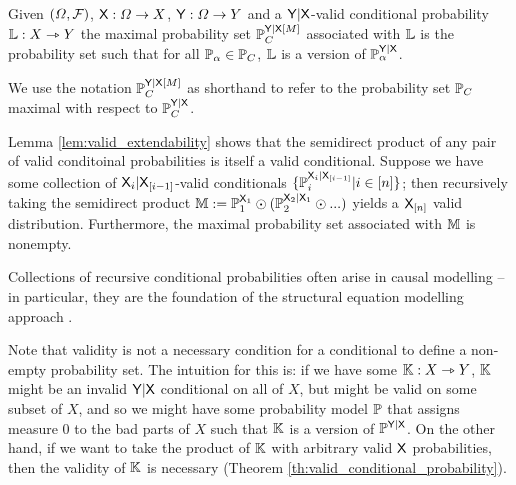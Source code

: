 \begin{definition}
Given $(\Omega,\mathcal{F})$, $\mathsf{X}:\Omega\to X$, $\mathsf{Y}:\Omega\to Y$ and a $\mathsf{Y}|\mathsf{X}$-valid conditional probability $\mathbb{L}:X\rightarrowtriangle Y$ the maximal probability set $\mathbb{P}_C^{\mathsf{Y}|\mathsf{X}[M]}$ associated with $\mathbb{L}$ is the probability set such that for all $\mathbb{P}_\alpha\in \mathbb{P}_C$, $\mathbb{L}$ is a version of $\mathbb{P}_\alpha^{\mathsf{Y}|\mathsf{X}}$.
\end{definition}

We use the notation $\mathbb{P}_C^{\mathsf{Y}|\mathsf{X}[M]}$ as shorthand to refer to the probability set $\mathbb{P}_C$ maximal with respect to $\mathbb{P}_C^{\mathsf{Y}|\mathsf{X}}$.

Lemma \ref{lem:valid_extendability} shows that the semidirect product of any pair of valid conditoinal probabilities is itself a valid conditional. Suppose we have some collection of $\mathsf{X}_i|\mathsf{X}_{[i-1]}$-valid conditionals $\{\mathbb{P}_i^{\mathsf{X}_i|\mathsf{X}_{[i-1]}}|i\in [n]\}$; then recursively taking the semidirect product $\mathbb{M}:=\mathbb{P}_1^{\mathsf{X}_1}\odot (\mathbb{P}_2^{\mathsf{X}_2|\mathsf{X}_{1}}\odot ...)$ yields a $\mathsf{X}_{[n]}$ valid distribution. Furthermore, the maximal probability set associated with $\mathbb{M}$ is nonempty.

Collections of recursive conditional probabilities often arise in causal modelling -- in particular, they are the foundation of the structural equation modelling approach \citet{richardson2013single,pearl_causality:_2009}.

Note that validity is not a necessary condition for a conditional to define a non-empty probability set. The intuition for this is: if we have some $\mathbb{K}:X\rightarrowtriangle Y$, $\mathbb{K}$ might be an invalid $\mathsf{Y}|\mathsf{X}$ conditional on all of $X$, but might be valid on some subset of $X$, and so we might have some probability model $\mathbb{P}$ that assigns measure 0 to the bad parts of $X$ such that $\mathbb{K}$ is a version of $\mathbb{P}^{\mathsf{Y}|\mathsf{X}}$. On the other hand, if we want to take the product of $\mathbb{K}$ with arbitrary valid $\mathsf{X}$ probabilities, then the validity of $\mathbb{K}$ is necessary (Theorem \ref{th:valid_conditional_probability}).

